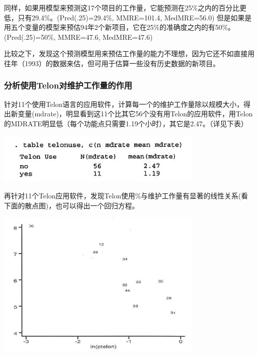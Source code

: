 同样，如果用模型来预测这17个项目的工作量，它能预测在25\%之内的百分比更低，只有29.4\%。(Pred(.25)=29.4\%,
MMRE=101.4, MedMRE=56.0)
但是如果是用五个变量的模型来预估94年2个新项目，它在25\%的准确度之内的有50\%。(Pred(.25)=50\%,
MMRE=47.6, MedMRE=47.6)

比较之下，发现这个预测模型用来预估工作量的能力不理想，因为它还不如直接用往年（1993）的数据来估，但可用于估算一些没有历史数据的新项目。

\hypertarget{ux5206ux6790ux4f7fux7528telonux5bf9ux7ef4ux62a4ux5de5ux4f5cux91cfux7684ux4f5cux7528}{%
\subsubsection{分析使用Telon对维护工作量的作用}\label{ux5206ux6790ux4f7fux7528telonux5bf9ux7ef4ux62a4ux5de5ux4f5cux91cfux7684ux4f5cux7528}}

针对11个使用Telon语言的应用软件，计算每一个的维护工作量除以规模大小，得出新变量(mdrate)，明显看到这11个比其它56个没有用Telon的应用软件，用Telon的MDRATE明显低（每个功能点只需要1.19个小时），其它是2.47。（详见下表）


\includegraphics[width=10cm]{maxwell_e531.jpg}

再针对11个Telon应用软件，发现Telon使用\%与维护工作量有显著的线性关系(看下面的散点图)，也可以得出一个回归方程。


\includegraphics[width=10cm]{maxwell_f553.jpg}

